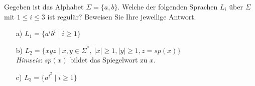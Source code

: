 
\begin{exercise}
Gegeben ist das Alphabet $\Sigma = \{a,b\}$. Welche der folgenden
Sprachen $L_i$ \"uber $\Sigma$ mit $1\le i\le 3$ ist regul\"ar? Beweisen Sie Ihre jeweilige
Antwort.
\begin{itemize}
\item[a)] $L_1=\{a^ib^i\mid i\ge 1\}$
\item[b)] $L_2=\{xyz\mid  x,y\in \Sigma^*, \ |x|\ge 1,|y|\ge 1, z=sp(x)\}\;\;\;$\\
{\emph{Hinweis}}: $sp(x)$ bildet das Spiegelwort zu $x$.
\item[c)] $L_3=\{a^{i^2}\mid i\ge 1\}$
\end{itemize}
\end{exercise}

